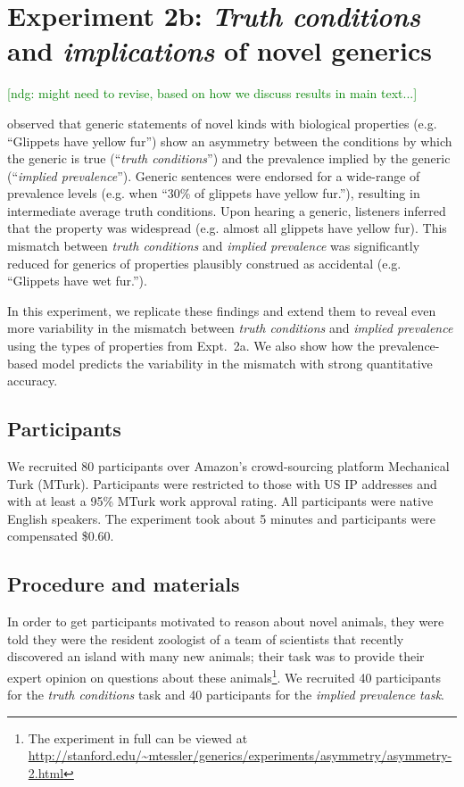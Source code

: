 \documentclass[10pt,letterpaper]{article}
\newcommand{\ndg}[1]{\textcolor{Green}{[ndg: #1]}}
\begin{document}
\section{Experiment 2b: \emph{Truth conditions} and \emph{implications} of novel generics}

\ndg{might need to revise, based on how we discuss results in main text...}

\citeauthor{Cimpian2010} observed that generic statements of novel kinds with biological properties (e.g. ``Glippets have yellow fur'') show an asymmetry between the conditions by which the generic is true (``\emph{truth conditions}'') and the prevalence implied by the generic (``\emph{implied prevalence}''). 
Generic sentences were endorsed for a wide-range of prevalence levels (e.g. when ``30\% of glippets have yellow fur.''), resulting in intermediate average truth conditions. 
Upon hearing a generic, listeners inferred that the property was widespread (e.g. almost all glippets have yellow fur).
This mismatch between \emph{truth conditions} and \emph{implied prevalence} was significantly reduced for generics of properties plausibly construed as accidental (e.g. ``Glippets have wet fur.'').

In this experiment,  we replicate these findings and extend them to reveal even more variability in the mismatch between \emph{truth conditions} and \emph{implied prevalence} using the types of properties from Expt.~2a.
We also show how the prevalence-based model predicts the variability in the mismatch with strong quantitative accuracy.


\subsection{Participants}

We recruited 80 participants over Amazon's crowd-sourcing platform Mechanical Turk (MTurk).  
Participants were restricted to those with US IP addresses and with at least a 95\% MTurk work approval rating. 
All participants were native English speakers. 
The experiment took about 5 minutes and participants were compensated \$0.60.

\subsection{Procedure and materials}

In order to get participants motivated to reason about novel animals, they were told they were the resident zoologist of a team of scientists that recently discovered an island with many new animals; their task was to provide their expert opinion on questions about these animals\footnote{The experiment in full can be viewed at \url{http://stanford.edu/~mtessler/generics/experiments/asymmetry/asymmetry-2.html}}. 
We recruited 40 participants for the \emph{truth conditions} task and 40 participants for the \emph{implied prevalence task}. 
\end{document}
